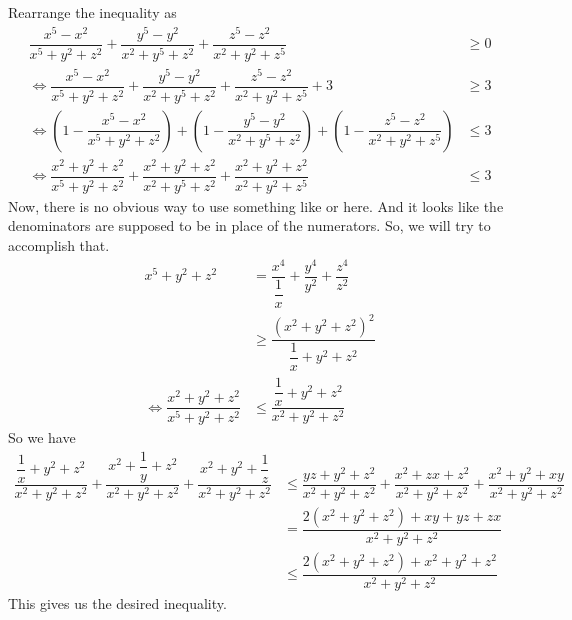 \documentclass[inequalities.tex]{subfile}
\begin{document}
\begin{problem}
				\begin{solution}
					Rearrange the inequality as
						\begin{align*}
							\dfrac{x^{5}-x^{2}}{x^{5}+y^{2}+z^{2}}+\dfrac{y^{5}-y^{2}}{x^{2}+y^{5}+z^{2}}+\dfrac{z^{5}-z^{2}}{x^{2}+y^{2}+z^{5}}
								& \geq0\\
							\iff \dfrac{x^{5}-x^{2}}{x^{5}+y^{2}+z^{2}}+\dfrac{y^{5}-y^{2}}{x^{2}+y^{5}+z^{2}}+\dfrac{z^{5}-z^{2}}{x^{2}+y^{2}+z^{5}}+3
								& \geq 3\\
							\iff \left(1-\dfrac{x^{5}-x^{2}}{x^{5}+y^{2}+z^{2}}\right)+\left(1-\dfrac{y^{5}-y^{2}}{x^{2}+y^{5}+z^{2}}\right)+\left(1-\dfrac{z^{5}-z^{2}}{x^{2}+y^{2}+z^{5}}\right)
								& \leq 3\\
							\iff \dfrac{x^{2}+y^{2}+z^{2}}{x^{5}+y^{2}+z^{2}}+\dfrac{x^{2}+y^{2}+z^{2}}{x^{2}+y^{5}+z^{2}}+\dfrac{x^{2}+y^{2}+z^{2}}{x^{2}+y^{2}+z^{5}}
								& \leq 3
						\end{align*}
					Now, there is no obvious way to use something like  or  here. And it looks like the denominators are supposed to be in place of the numerators. So, we will try to accomplish that.
						\begin{align*}
							x^{5}+y^{2}+z^{2}
								& = \dfrac{x^{4}}{\dfrac{1}{x}}+\dfrac{y^{4}}{y^{2}}+\dfrac{z^{4}}{z^{2}}\\
								& \geq \dfrac{(x^{2}+y^{2}+z^{2})^{2}}{\dfrac{1}{x}+y^{2}+z^{2}}\\
							\iff \dfrac{x^{2}+y^{2}+z^{2}}{x^{5}+y^{2}+z^{2}}
								& \leq \dfrac{\dfrac{1}{x}+y^{2}+z^{2}}{x^{2}+y^{2}+z^{2}}
						\end{align*}
					So we have
							\begin{align*}		\dfrac{\dfrac{1}{x}+y^{2}+z^{2}}{x^{2}+y^{2}+z^{2}}+\dfrac{x^{2}+\dfrac{1}{y}+z^{2}}{x^{2}+y^{2}+z^{2}}+\dfrac{x^{2}+y^{2}+\dfrac{1}{z}}{x^{2}+y^{2}+z^{2}}
								& \leq \dfrac{yz+y^{2}+z^{2}}{x^{2}+y^{2}+z^{2}}+\dfrac{x^{2}+zx+z^{2}}{x^{2}+y^{2}+z^{2}}+\dfrac{x^{2}+y^{2}+xy}{x^{2}+y^{2}+z^{2}}\\
								& = \dfrac{2(x^{2}+y^{2}+z^{2})+xy+yz+zx}{x^{2}+y^{2}+z^{2}}\\
								& \leq \dfrac{2(x^{2}+y^{2}+z^{2})+x^{2}+y^{2}+z^{2}}{x^{2}+y^{2}+z^{2}}
						\end{align*}
					This gives us the desired inequality.
				\end{solution}
		\end{problem}
\end{document}
